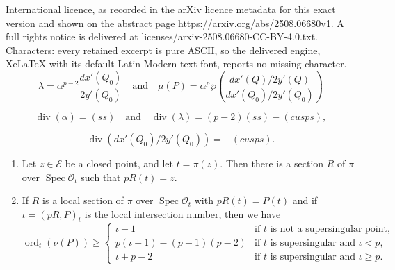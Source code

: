 \documentclass[10pt,a4paper]{amsart}
\DeclareMathOperator{\dvsr}{div}
\DeclareMathOperator{\ord}{ord}
\DeclareMathOperator{\spec}{Spec}
\newcommand{\EE}{\mathcal{E}}
\newcommand{\OO}{\mathcal{O}}
\renewcommand{\and}{\quad\text{and}\quad}
\begin{document}
International licence, as recorded in the arXiv licence metadata for this exact version and shown on the abstract page https://arxiv.org/abs/2508.06680v1. A full rights notice is delivered at licenses/arxiv-2508.06680-CC-BY-4.0.txt. Characters: every retained excerpt is pure ASCII, so the delivered engine, XeLaTeX with its default Latin Modern text font, reports no missing character.
\begin{equation}\label{eq:Broumas2}
\lambda=\alpha^{p-2}\frac{dx'(Q_0)}{2y'(Q_0)}
  \and
  \mu(P)=\alpha^p\wp\left(
    \frac{dx'(Q)/2y'(Q)}{dx'(Q_0)/2y'(Q_0)}\right)  
\end{equation}

\begin{equation}\label{eq:divs1}
\dvsr(\alpha)=(ss)\and\dvsr(\lambda)=(p-2)(ss)-(cusps),  
\end{equation}

\begin{equation}\label{eq:divs2}
  \dvsr\left(dx'(Q_0)/2y'(Q_0)\right)=-(cusps).
\end{equation}

\begin{prop}\label{prop:local-points-and-bounds}\mbox{}
  \begin{enumerate}
  \item   Let $z\in\EE$ be a closed point, and let $t=\pi(z)$.  Then
    there is a section $R$ of $\pi$ over $\spec\OO_t$ such that $pR(t)=z$.
  \item If $R$ is a local section of $\pi$ over $\spec\OO_t$ with
    $pR(t)=P(t)$ and if $\iota=(pR,P)_t$ is the local intersection
    number, then we have
\[\ord_t(\nu(P))\ge
  \begin{cases}
    \iota-1&\text{if $t$ is not a supersingular point,}\\
    p(\iota-1)-(p-1)(p-2)
       &\text{if $t$ is supersingular and $\iota< p$,}\\
    \iota+p-2
       &\text{if $t$ is supersingular and $\iota\ge p$.}
  \end{cases}\]
  \end{enumerate}
\end{prop}
\end{document}
